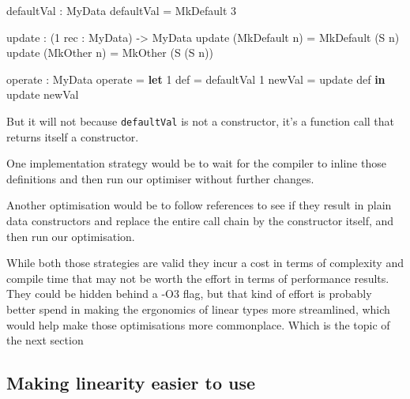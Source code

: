 \documentclass[
]{article}
\newenvironment{Shaded}{}{}
\newcommand{\DataTypeTok}[1]{\textcolor[rgb]{0.56,0.13,0.00}{#1}}
\newcommand{\DecValTok}[1]{\textcolor[rgb]{0.25,0.63,0.44}{#1}}
\newcommand{\KeywordTok}[1]{\textcolor[rgb]{0.00,0.44,0.13}{\textbf{#1}}}
\newcommand{\NormalTok}[1]{#1}
\newcommand{\OperatorTok}[1]{\textcolor[rgb]{0.40,0.40,0.40}{#1}}
\newcommand{\OtherTok}[1]{\textcolor[rgb]{0.00,0.44,0.13}{#1}}
\begin{document}
\begin{Shaded}
\begin{Highlighting}[]
\NormalTok{defaultVal }\OperatorTok{:} \DataTypeTok{MyData}
\NormalTok{defaultVal }\OtherTok{=} \DataTypeTok{MkDefault} \DecValTok{3}

\NormalTok{update }\OperatorTok{:}\NormalTok{ (}\DecValTok{1}\NormalTok{ rec }\OperatorTok{:} \DataTypeTok{MyData}\NormalTok{) }\OtherTok{{-}\textgreater{}} \DataTypeTok{MyData}
\NormalTok{update (}\DataTypeTok{MkDefault}\NormalTok{ n) }\OtherTok{=} \DataTypeTok{MkDefault}\NormalTok{ (}\DataTypeTok{S}\NormalTok{ n)}
\NormalTok{update (}\DataTypeTok{MkOther}\NormalTok{ n) }\OtherTok{=} \DataTypeTok{MkOther}\NormalTok{ (}\DataTypeTok{S}\NormalTok{ (}\DataTypeTok{S}\NormalTok{ n))}

\NormalTok{operate }\OperatorTok{:} \DataTypeTok{MyData}
\NormalTok{operate }\OtherTok{=} \KeywordTok{let} \DecValTok{1}\NormalTok{ def }\OtherTok{=}\NormalTok{ defaultVal}
              \DecValTok{1}\NormalTok{ newVal }\OtherTok{=}\NormalTok{ update def }\KeywordTok{in}
\NormalTok{              update newVal}
\end{Highlighting}
\end{Shaded}

But it will not because \texttt{defaultVal} is not a constructor, it's a
function call that returns itself a constructor.

One implementation strategy would be to wait for the compiler to inline
those definitions and then run our optimiser without further changes.

Another optimisation would be to follow references to see if they result
in plain data constructors and replace the entire call chain by the
constructor itself, and then run our optimisation.

While both those strategies are valid they incur a cost in terms of
complexity and compile time that may not be worth the effort in terms of
performance results. They could be hidden behind a -O3 flag, but that
kind of effort is probably better spend in making the ergonomics of
linear types more streamlined, which would help make those optimisations
more commonplace. Which is the topic of the next section

\hypertarget{making-linearity-easier-to-use}{%
\subsection{Making linearity easier to
use}\label{making-linearity-easier-to-use}}
\end{document}

